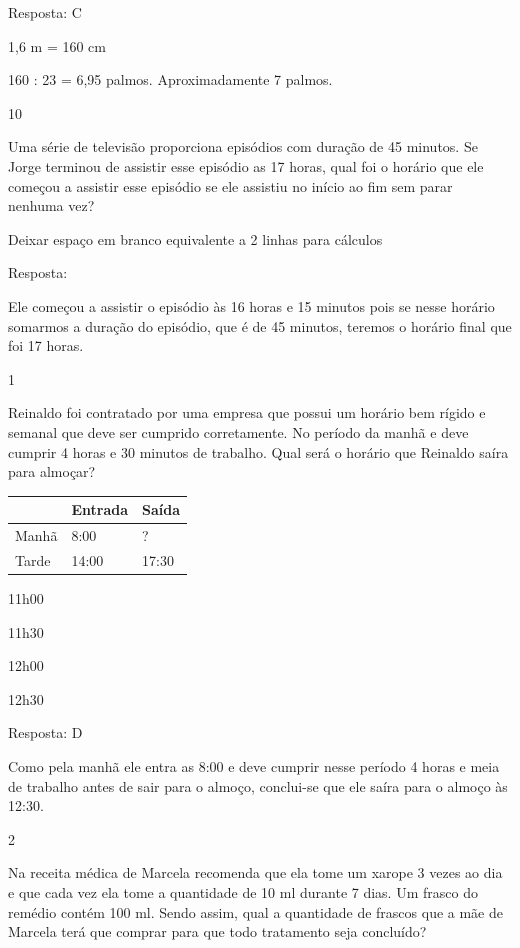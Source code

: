 \begin{escolha}
Resposta: C

1,6 m = 160 cm

160 : 23 = 6,95 palmos. Aproximadamente 7 palmos.

\num{10}

Uma série de televisão proporciona episódios com duração de 45 minutos.
Se Jorge terminou de assistir esse episódio as 17 horas, qual foi o
horário que ele começou a assistir esse episódio se ele assistiu no
início ao fim sem parar nenhuma vez?

Deixar espaço em branco equivalente a 2 linhas para cálculos

Resposta:

Ele começou a assistir o episódio às 16 horas e 15 minutos pois se nesse
horário somarmos a duração do episódio, que é de 45 minutos, teremos o
horário final que foi 17 horas.


\num{1}

Reinaldo foi contratado por uma empresa que possui um horário bem rígido
e semanal que deve ser cumprido corretamente. No período da manhã e deve
cumprir 4 horas e 30 minutos de trabalho. Qual será o horário que
Reinaldo saíra para almoçar?

\begin{longtable}[]{@{}lll@{}}
\toprule
& Entrada & Saída\tabularnewline
\midrule
\endhead
Manhã & 8:00 & ?\tabularnewline
Tarde & 14:00 & 17:30\tabularnewline
\bottomrule
\end{longtable}

\begin{escolha}
\item
  11h00
\item
  11h30
\item
  12h00
\item
  12h30
\end{escolha}

Resposta: D

Como pela manhã ele entra as 8:00 e deve cumprir nesse período 4 horas e
meia de trabalho antes de sair para o almoço, conclui-se que ele saíra
para o almoço às 12:30.

\num{2}

Na receita médica de Marcela recomenda que ela tome um xarope 3 vezes ao
dia e que cada vez ela tome a quantidade de 10 ml durante 7 dias. Um
frasco do remédio contém 100 ml. Sendo assim, qual a quantidade de
frascos que a mãe de Marcela terá que comprar para que todo tratamento
seja concluído?


\end{escolha}
